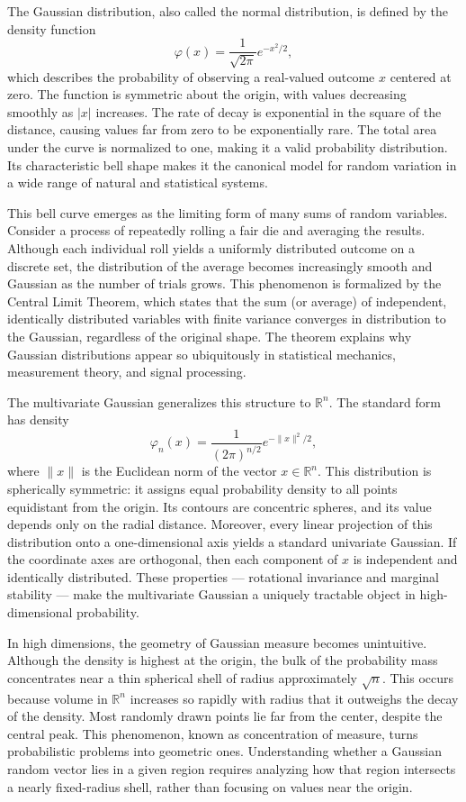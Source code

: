 The Gaussian distribution, also called the normal distribution, is defined by the density function
\[
\varphi(x) = \frac{1}{\sqrt{2\pi}} e^{-x^2/2},
\]
which describes the probability of observing a real-valued outcome \( x \) centered at zero. The function is symmetric about the origin, with values decreasing smoothly as \( |x| \) increases. The rate of decay is exponential in the square of the distance, causing values far from zero to be exponentially rare. The total area under the curve is normalized to one, making it a valid probability distribution. Its characteristic bell shape makes it the canonical model for random variation in a wide range of natural and statistical systems.

This bell curve emerges as the limiting form of many sums of random variables. Consider a process of repeatedly rolling a fair die and averaging the results. Although each individual roll yields a uniformly distributed outcome on a discrete set, the distribution of the average becomes increasingly smooth and Gaussian as the number of trials grows. This phenomenon is formalized by the Central Limit Theorem, which states that the sum (or average) of independent, identically distributed variables with finite variance converges in distribution to the Gaussian, regardless of the original shape. The theorem explains why Gaussian distributions appear so ubiquitously in statistical mechanics, measurement theory, and signal processing.

The multivariate Gaussian generalizes this structure to \( \mathbb{R}^n \). The standard form has density
\[
\varphi_n(x) = \frac{1}{(2\pi)^{n/2}} e^{-\|x\|^2/2},
\]
where \( \|x\| \) is the Euclidean norm of the vector \( x \in \mathbb{R}^n \). This distribution is spherically symmetric: it assigns equal probability density to all points equidistant from the origin. Its contours are concentric spheres, and its value depends only on the radial distance. Moreover, every linear projection of this distribution onto a one-dimensional axis yields a standard univariate Gaussian. If the coordinate axes are orthogonal, then each component of \( x \) is independent and identically distributed. These properties — rotational invariance and marginal stability — make the multivariate Gaussian a uniquely tractable object in high-dimensional probability.

In high dimensions, the geometry of Gaussian measure becomes unintuitive. Although the density is highest at the origin, the bulk of the probability mass concentrates near a thin spherical shell of radius approximately \( \sqrt{n} \). This occurs because volume in \( \mathbb{R}^n \) increases so rapidly with radius that it outweighs the decay of the density. Most randomly drawn points lie far from the center, despite the central peak. This phenomenon, known as concentration of measure, turns probabilistic problems into geometric ones. Understanding whether a Gaussian random vector lies in a given region requires analyzing how that region intersects a nearly fixed-radius shell, rather than focusing on values near the origin.

